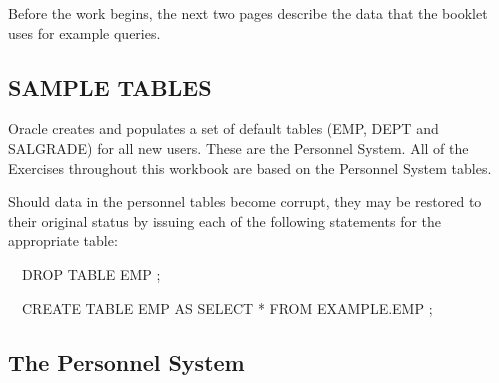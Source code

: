 Before the work begins, the next two pages describe the data that the booklet uses for example queries.

\clearpage
\subsection{SAMPLE TABLES}
Oracle creates and populates a set of default tables (EMP, DEPT and SALGRADE) for all new users. These are the Personnel System. All of the Exercises throughout this workbook are based on the Personnel System tables.

Should data in the personnel tables become corrupt, they may be restored to their original status by issuing each of the following statements for the appropriate table:

\ \ DROP TABLE EMP ;

\ \ CREATE TABLE EMP AS SELECT * FROM EXAMPLE.EMP ;

\subsection{The Personnel System}
